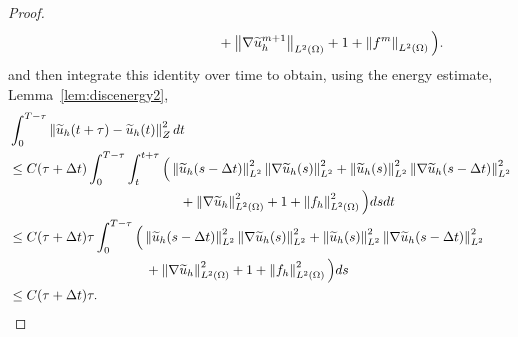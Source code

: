 \documentclass[10pt,letterpaper]{amsart}
\newcommand{\tu}{\widetilde{u}}
\newcommand\norm[1]{\left\lVert#1\right\rVert}
\newcommand{\Grad}{\nabla}
\newcommand{\dom}{\Omega}
\theoremstyle{definition}{\newtheorem{definition}[lemma]{Definition}}
\numberwithin{equation}{section}
\begin{document}
\begin{proof}
\begin{align*}
			&\quad\hphantom{\leq C (\tau+\Delta t)\Delta t  \sum_{m=m_1}^{m_2} \Big( } + \norm{\Grad \tu^{m+1}_h}_{L^2(\dom)}+ 1+ \norm{f^m}_{ L^2(\dom)} \Big).
	\end{align*}
	and then integrate this identity over time to obtain, using the energy estimate, Lemma~\ref{lem:discenergy2},  
	\begin{equation*}
	\begin{split}
			&\int_0^{T-\tau}\norm{\tu_h(t+\tau)-\tu_h(t)}^2_Z  dt  \\
			& \leq C (\tau+\Delta t)\int_0^{T-\tau} \int_t^{t+\tau} \Big( \norm{\tu _h(s-\Delta t)}_{L^2}^2 \norm{\Grad\tu_h(s)}^2_{L^2}+\norm{\tu _h(s)}_{L^2}^2 \norm{\Grad\tu_h(s-\Delta t)}^2_{L^2}\\
			&\quad \hphantom{\leq C (\tau+\Delta t)\int_0^{T-\tau} \int_t^{t+\tau} \Big(}+ \norm{\Grad \tu_h}^2_{L^2(\dom)}+ 1+ \norm{f_h}^2_{ L^2(\dom)} \Big) ds dt\\
			& \leq C (\tau+\Delta t)\tau \int_0^{T-\tau} \Big( \norm{\tu _h(s-\Delta t)}_{L^2}^2 \norm{\Grad\tu_h(s)}^2_{L^2}+\norm{\tu _h(s)}_{L^2}^2 \norm{\Grad\tu_h(s-\Delta t)}^2_{L^2}\\
			&\quad \hphantom{\leq C (\tau+\Delta t)\int_0^{T-\tau}  \Big(}+ \norm{\Grad \tu_h}^2_{L^2(\dom)}+ 1+ \norm{f_h}^2_{ L^2(\dom)} \Big) ds \\
			& \leq C (\tau+\Delta t)\tau. 
	\end{split}
	\end{equation*}
\end{proof}
\end{document}

